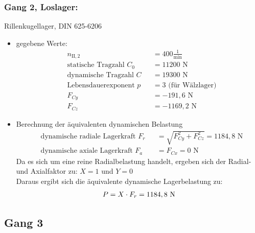 \subsubsection{Gang 2, Loslager:} Rillenkugellager, DIN 625-6206\\
\begin{itemize}
	\item gegebene Werte:
	\begin{align*}
	&n_{{\mathord{\mathrm{II}},2}} &&=  400 \frac{1}{\text{min}} \\
	&\text{statische Tragzahl } C_{0} &&= 11200 \text{ N}\\
	&\text{dynamische Tragzahl } C &&= 19300 \text{ N} \\
	&\text{Lebensdauerexponent } p &&= 3 \text{ (für Wälzlager)} \\
	&F_{Cy} && = -191,6\text{ N}\\
	&F_{Cz} && =-1169,2 \text{ N}
	\end{align*} 
	\item Berechnung der äquivalenten dynamischen Belastung
	\begin{align*}
	&\text{dynamische radiale Lagerkraft } F_r&& = \sqrt{F_{Cy}^2 + F_{Cz}^2 } =1184,8 \text{ N} \\
	&\text{dynamische axiale Lagerkraft } F_a&& = F_{Cx} = 0\text{ N}
	\end{align*} 
	Da es sich um eine reine Radialbelastung handelt, ergeben sich der Radial- und Axialfaktor zu: $X= 1$ und $Y=0$\\
	Daraus ergibt sich die äquivalente dynamische Lagerbelastung zu:  
	\[
	P= X \cdot F_r =1184,8 \text{ N}
	\]
\end{itemize}
\newpage

\subsection{Gang 3}
